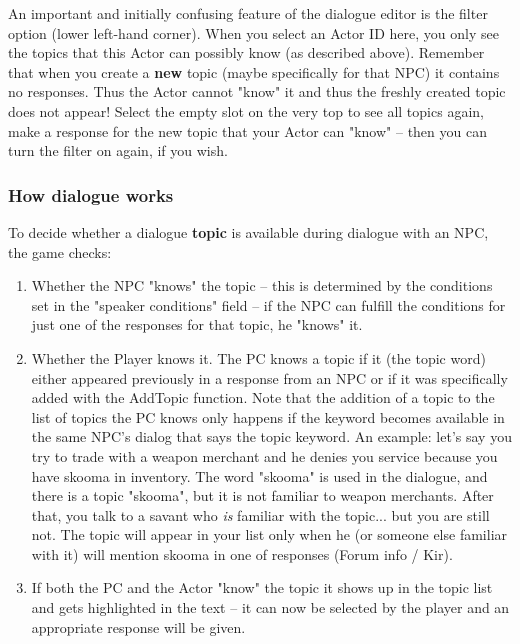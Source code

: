 An important and initially confusing feature of the dialogue editor is
the filter option (lower left-hand corner). When you select an Actor ID
here, you only see the topics that this Actor can possibly know (as
described above). Remember that when you create a \textbf{new} topic
(maybe specifically for that NPC) it contains no responses. Thus the
Actor cannot "know" it and thus the freshly created topic does not
appear! Select the empty slot on the very top to see all topics again,
make a response for the new topic that your Actor can "know" -- then you
can turn the filter on again, if you wish.

\hypertarget{how-dialogue-works}{%
\subsubsection{How dialogue works}\label{how-dialogue-works}}

To decide whether a dialogue \textbf{topic} is available during dialogue
with an NPC, the game checks:

\begin{enumerate}
\def\labelenumi{\arabic{enumi}.}
\item
  Whether the NPC "knows" the topic -- this is determined by the
  conditions set in the "speaker conditions" field -- if the NPC can
  fulfill the conditions for just one of the responses for that topic,
  he "knows" it.
\item
  Whether the Player knows it. The PC knows a topic if it (the topic
  word) either appeared previously in a response from an NPC or if it
  was specifically added with the AddTopic function. Note that the
  addition of a topic to the list of topics the PC knows only happens if
  the keyword becomes available in the same NPC's dialog that says the
  topic keyword. An example: let's say you try to trade with a weapon
  merchant and he denies you service because you have skooma in
  inventory. The word "skooma" is used in the dialogue, and there is a
  topic "skooma", but it is not familiar to weapon merchants. After
  that, you talk to a savant who \emph{is} familiar with the topic...
  but you are still not. The topic will appear in your list only when he
  (or someone else familiar with it) will mention skooma in one of
  responses (Forum info / Kir).
\item
  If both the PC and the Actor "know" the topic it shows up in the topic
  list and gets highlighted in the text -- it can now be selected by the
  player and an appropriate response will be given.
\end{enumerate}

